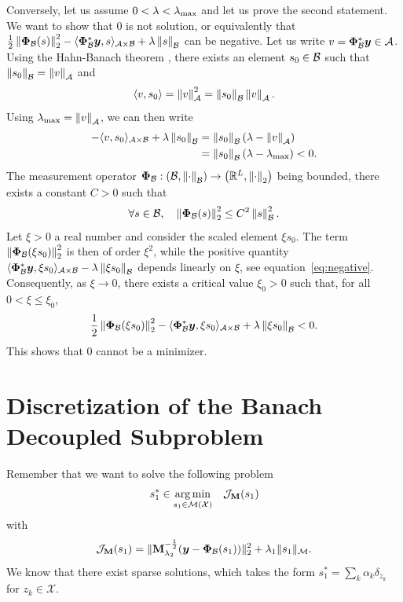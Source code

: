    Conversely, let us assume $0 < \lambda < \lambda_\mathrm{max}$ and let us prove the second statement. We want to show that $0$ is not solution, or equivalently that $\frac{1}{2} \left\lVert\bm{\Phi}_\mathcal{B}(s)\right\rVert_2^2 - \langle \bm{\Phi}_\mathcal{B}^*\bm{y}, s \rangle_{\mathcal{A} \times\mathcal{B}} + \lambda \left\lVert s\right\rVert_{\mathcal{B}}$ can be negative. Let us write $v = \bm{\Phi}_\mathcal{B}^*\bm{y} \in \mathcal{A}$. Using the Hahn-Banach theorem \cite[Chapter~1]{Brezis_2011}, there exists an element $s_0\in\mathcal{B}$ such that $\left\lVert s_0\right\rVert_{\mathcal{B}} = \left\lVert v\right\rVert_{\mathcal{A}}$ and
    \begin{equation*}
        \langle v, s_0\rangle = \left\lVert v\right\rVert_{\mathcal{A}}^2 = \left\lVert s_0\right\rVert_{\mathcal{B}} \left\lVert v\right\rVert_{\mathcal{A}}.
    \end{equation*}
    Using $\lambda_\mathrm{max} = \left\lVert v\right\rVert_{\mathcal{A}}$, we can then write
    \begin{align}
        - \langle v, s_0 \rangle_{\mathcal{A} \times\mathcal{B}} + \lambda \left\lVert s_0\right\rVert_{\mathcal{B}} &= \left\lVert s_0\right\rVert_{\mathcal{B}} \left( \lambda - \left\lVert v\right\rVert_{\mathcal{A}} \right) \nonumber \\
            &= \left\lVert s_0\right\rVert_{\mathcal{B}} \left( \lambda - \lambda_\mathrm{max} \right) < 0. \label{eq:negative}
    \end{align}
    The measurement operator $\bm{\Phi}_\mathcal{B}: \left(\mathcal{B}, \left\lVert\cdot\right\rVert_{\mathcal{B}} \right) \to \left(\mathbb{R}^L, \left\lVert\cdot\right\rVert_2\right)$ being bounded, there exists a constant $C > 0$ such that
    \begin{equation*}
        \forall s \in \mathcal{B}, \quad \left\lVert\bm{\Phi}_\mathcal{B}(s)\right\rVert_2^2 \leq C^2 \left\lVert s\right\rVert_{\mathcal{B}}^2.
    \end{equation*}
    Let $\xi > 0$ a real number and consider the scaled element $\xi s_0$.
    The term $\left\lVert\bm{\Phi}_\mathcal{B}(\xi s_0)\right\rVert_2^2$ is then of order $\xi^2$, while the positive quantity $\langle \bm{\Phi}_\mathcal{B}^*\bm{y}, \xi s_0 \rangle_{\mathcal{A} \times\mathcal{B}} - \lambda \left\lVert\xi s_0\right\rVert_{\mathcal{B}}$ depends linearly on $\xi$, see equation~\eqref{eq:negative}. Consequently, as $\xi \to 0$, there exists a critical value $\xi_0 > 0$ such that, for all $0 < \xi \leq \xi_0$,  
    \begin{equation*}
        \frac{1}{2} \left\lVert\bm{\Phi}_\mathcal{B}(\xi s_0)\right\rVert_2^2 - \langle \bm{\Phi}_\mathcal{B}^*\bm{y}, \xi s_0 \rangle_{\mathcal{A} \times\mathcal{B}} + \lambda \left\lVert\xi s_0\right\rVert_{\mathcal{B}} < 0.
    \end{equation*}
    This shows that $0$ cannot be a minimizer.

\section{Discretization of the Banach Decoupled Subproblem}
    \label{app:discretization}
        Remember that we want to solve the following problem
        $$s_1^* \in \underset{ s_1\in{\mathcal{M}}({\mathcal{X}})}{\arg\min} \quad \mathcal{J}_{\mathbf{M}}(s_1)$$
        with
        $$\mathcal{J}_{\mathbf{M}}(s_1)= \|\mathbf{M}_{\lambda_{2}}^{-\frac{1}{2}} ( \bm{y} - \bm{\Phi}_\mathcal{B}(s_1)  ) \|_2^2  + \lambda_{1} \| s_1 \|_{\mathcal{M}}.$$
        We know that there exist sparse solutions, which takes the form $s_1^* = \sum_k \alpha_k \delta_{z_k}$ for $z_k\in\mathcal{X}$.

